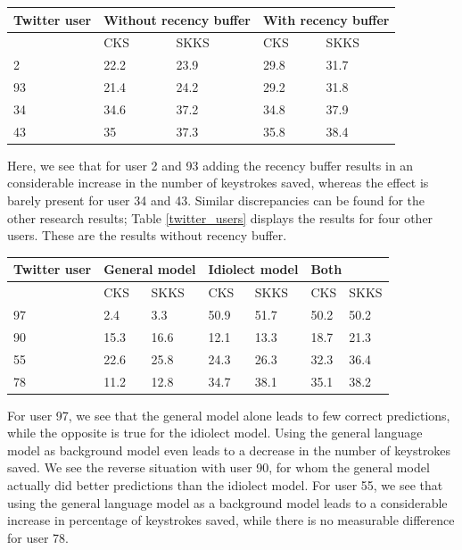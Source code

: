 \documentclass[11pt]{article}
\let\originaltable\table
\let\endoriginaltable\endtable
\renewenvironment{table}[1][ht]{%
  \originaltable[#1]
  \centering}%
  {\endoriginaltable}
\begin{document}
\begin{table}[H] 
\centering
\begin{tabular}{l|llll} 
Twitter user&\multicolumn{2}{l}{Without recency buffer}&\multicolumn{2}{l}{With recency buffer}\\
\hline
&CKS&SKKS&CKS&SKKS\\
2&22.2&23.9&29.8&31.7\\
93&21.4&24.2&29.2&31.8\\
34&34.6&37.2&34.8&37.9\\
43&35&37.3&35.8&38.4\\
\end{tabular} 
\caption{Percentage of keystrokes saved for 4 individual Twitter users, with and without the recency buffer} \label{twitter_users_rb}
\end{table}

Here, we see that for user 2 and 93 adding the recency buffer results in an considerable increase in the number of keystrokes saved, whereas the effect is barely present for user 34 and 43. Similar discrepancies can be found for the other research results; Table \ref{twitter_users} displays the results for four other users. These are the results without recency buffer.

\begin{table}[H] 
\centering
\begin{tabular}{l|llllll} 
Twitter user&\multicolumn{2}{l}{General model}&\multicolumn{2}{l}{Idiolect model}&\multicolumn{2}{l}{Both}\\
\hline
&CKS&SKKS&CKS&SKKS&CKS&SKKS\\
97&2.4&3.3&50.9&51.7&50.2&50.2\\
90&15.3&16.6&12.1&13.3&18.7&21.3\\
55&22.6&25.8&24.3&26.3&32.3&36.4\\
78&11.2&12.8&34.7&38.1&35.1&38.2\\
\end{tabular} 
\caption{Percentage of keystrokes saved for 4 individual Twitter users, for the idiolect and the general model} \label{twitter_users}
\end{table}

For user 97, we see that the general model alone leads to few correct predictions, while the opposite is true for the idiolect model. Using the general language model as background model even leads to a decrease in the number of keystrokes saved. We see the reverse situation with user 90, for whom the general model actually did better predictions than the idiolect model. For user 55, we see that using the general language model as a background model leads to a considerable increase in percentage of keystrokes saved, while there is no measurable difference for user 78.
\end{document}
